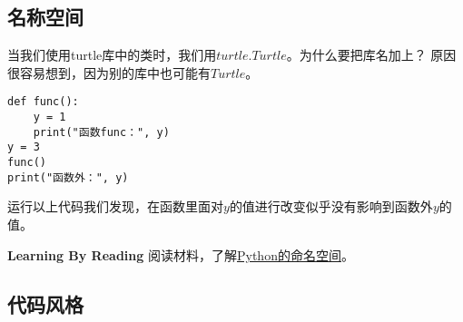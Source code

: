 \subsection{名称空间}
当我们使用turtle库中的类时，我们用$turtle.Turtle$。为什么要把库名加上？
原因很容易想到，因为别的库中也可能有$Turtle$。
\begin{lstlisting}[style=PythonStyle1, caption=Rectangle]
def func():
    y = 1
	print("函数func：", y)
y = 3
func()
print("函数外：", y)
\end{lstlisting}
运行以上代码我们发现，在函数里面对$y$的值进行改变似乎没有影响到函数外$y$的值。
\begin{paperbox}{\textbf{Learning By Reading}\starfive}
阅读材料，了解\href{https://segmentfault.com/a/1190000004519811}{Python的命名空间}。
\end{paperbox}
\subsection{代码风格}
